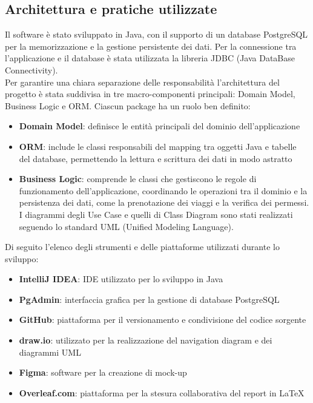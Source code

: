 \subsection{Architettura e pratiche utilizzate}
Il software è stato sviluppato in Java, con il supporto di un database PostgreSQL per la memorizzazione e la gestione persistente dei dati. Per la connessione tra l’applicazione e il database è stata utilizzata la libreria JDBC (Java DataBase Connectivity).\\
\noindent
Per garantire una chiara separazione delle responsabilità l'architettura del progetto è stata suddivisa in tre macro-componenti principali: Domain Model, Business Logic e ORM. Ciascun package ha un ruolo ben definito:
\begin{itemize}
\item \textbf{Domain Model}: definisce le entità principali del dominio dell'applicazione
\item \textbf{ORM}: include le classi responsabili del mapping tra oggetti Java e tabelle del database, permettendo la lettura e scrittura dei dati in modo astratto
\item \textbf{Business Logic}: comprende le classi che gestiscono le regole di funzionamento dell'applicazione, coordinando le operazioni tra il dominio e la persistenza dei dati, come la prenotazione dei viaggi e la verifica dei permessi.
I diagrammi degli Use Case e quelli di Class Diagram sono stati realizzati seguendo lo standard UML (Unified Modeling Language).
\end{itemize}
\noindent Di seguito l’elenco degli strumenti e delle piattaforme utilizzati durante lo sviluppo:
\begin{itemize}
\item \textbf{IntelliJ IDEA}: IDE utilizzato per lo sviluppo in Java
\item \textbf{PgAdmin}: interfaccia grafica per la gestione di database PostgreSQL
\item \textbf{GitHub}: piattaforma per il versionamento e condivisione del codice sorgente
\item \textbf{draw.io}: utilizzato per la realizzazione del navigation diagram e dei diagrammi UML
\item \textbf{Figma}: software per la creazione di mock-up
\item \textbf{Overleaf.com}: piattaforma per la stesura collaborativa del report in \LaTeX
\end{itemize}
\newpage
